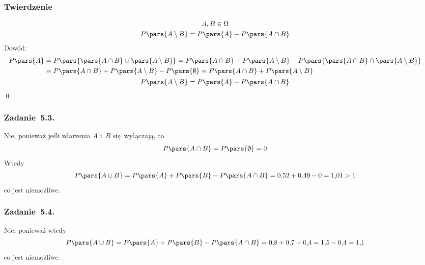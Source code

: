 \subsubsection*{Twierdzenie}
\begin{gather*}
    A, B \in \Omega\\
    P\pars{A \setminus B} = P\pars{A} - P\pars{A \cap B}
\end{gather*}
Dowód:
\begin{gather*}
    \begin{split}
        P\pars{A}
            &= P\pars{\pars{A \cap B} \cup \pars{A \setminus B}}
            = P\pars{A \cap B} + P\pars{A \setminus B} - P\pars{\pars{A \cap B} \cap \pars{A \setminus B}}\\
            &= P\pars{A \cap B} + P\pars{A \setminus B} - P\pars{\emptyset}
            = P\pars{A \cap B} + P\pars{A \setminus B}
    \end{split}\\
    P\pars{A \setminus B} = P\pars{A} - P\pars{A \cap B}
\end{gather*}
\qed
\subsubsection*{Zadanie~5.3.}
Nie, ponieważ jeśli zdarzenia \(A\) i~\(B\) się wyłączają, to
\begin{equation*}
    P\pars{A \cap B}
        = P\pars{\emptyset}
        = 0
\end{equation*}
Wtedy
\begin{equation*}
    P\pars{A \cup B}
        = P\pars{A} + P\pars{B} - P\pars{A \cap B}
        = 0{,}52 + 0{,}49 - 0
        = 1{,}01 > 1
\end{equation*}
co jest niemożliwe.
\subsubsection*{Zadanie~5.4.}
Nie, ponieważ wtedy
\begin{equation*}
    P\pars{A \cup B}
        = P\pars{A} + P\pars{B} - P\pars{A \cap B}
        = 0{,}8 + 0{,}7 - 0{,}4
        = 1{,}5 - 0{,}4
        = 1{,}1
\end{equation*}
co jest niemożliwe.
